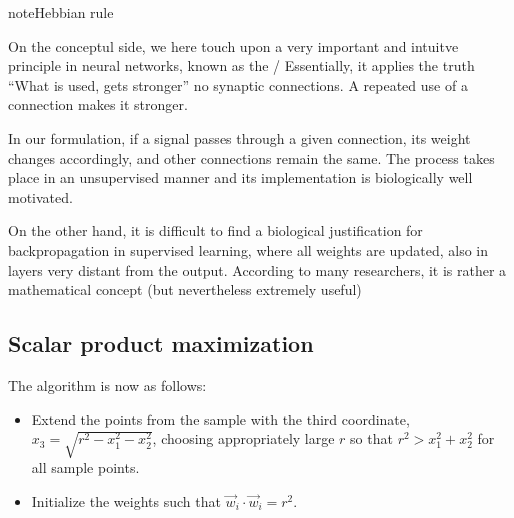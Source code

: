 \documentclass[letterpaper,10pt,english]{jupyterBook}
\begin{document}
\begin{sphinxadmonition}{note}{Hebbian rule}

\sphinxAtStartPar
On the conceptul side, we here touch upon a very important and intuitve principle in neural networks, known as the / Essentially, it applies the truth “What is used, gets stronger” no synaptic connections. A repeated use of a connection makes it stronger.

\sphinxAtStartPar
In our formulation, if a signal passes through a given connection, its weight changes accordingly, and other connections remain the same. The process takes place in an unsupervised manner and its implementation is biologically well motivated.

\sphinxAtStartPar
On the other hand, it is difficult to find a biological justification for backpropagation in supervised learning, where all weights are updated, also in layers very distant from the output. According to many researchers, it is rather a mathematical concept (but nevertheless extremely useful)
\end{sphinxadmonition}


\subsection{Scalar product maximization}
\label{\detokenize{docs/unsupervised:scalar-product-maximization}}
\sphinxAtStartPar
The algorithm is now as follows:
\begin{itemize}
\item {} 
\sphinxAtStartPar
Extend the points from the sample with the third coordinate, \( x_3 = \sqrt {r ^ 2-x_1 ^ 2-x_2 ^ 2} \), choosing appropriately large \( r \) so that \( r ^ 2> x_1 ^ 2 + x_2 ^ 2 \) for all sample points.

\item {} 
\sphinxAtStartPar
Initialize the weights such that \( \vec {w} _i \cdot \vec {w} _i = r ^ 2 \).

\end{itemize}
\end{document}

